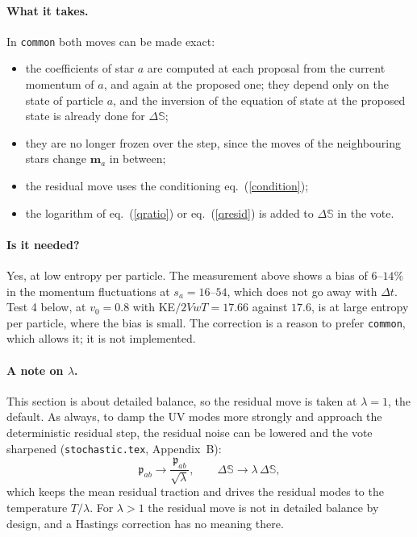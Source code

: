\documentclass[11pt,aps,preprint,nofootinbib,superscriptaddress,tightenlines]{revtex4-2}
\def\st{\begin{equation}}
\def\stp{\end{equation}}
\def\Eq#1{eq.~(\ref{#1})}
\let\oldparagraph\paragraph
\renewcommand{\paragraph}{\par\bigskip\oldparagraph}
\begin{document}
\paragraph{What it takes.}  In \texttt{common} both moves can be made exact:
\begin{itemize}
\item the coefficients of star $a$ are computed at each proposal from the current momentum of $a$, and again at the proposed one; they
  depend only on the state of particle $a$, and the inversion of the equation of state at the proposed state is already done for
  $\Delta\mathbb S$;
\item they are no longer frozen over the step, since the moves of the neighbouring stars change $\bm m_a$ in between;
\item the residual move uses the conditioning \Eq{condition};
\item the logarithm of \Eq{qratio} or \Eq{qresid} is added to $\Delta\mathbb S$ in the vote.
\end{itemize}

\paragraph{Is it needed?}  Yes, at low entropy per particle.  The measurement above shows a bias of $6$--$14\%$ in the momentum
fluctuations at $s_a=16$--$54$, which does not go away with $\Delta t$.  Test 4 below, at $v_0=0.8$ with KE$/2VwT=17.66$ against $17.6$,
is at large entropy per particle, where the bias is small.  The correction is a reason to prefer \texttt{common}, which allows it;
it is not implemented.

\paragraph{A note on $\lambda$.}  This section is about detailed balance, so the residual move is taken at $\lambda=1$, the default.
As always, to damp the UV modes more strongly and approach the deterministic residual step, the residual noise can be lowered
and the vote sharpened (\texttt{stochastic.tex}, Appendix~B):
\st
\mathfrak p_{ab}\to\frac{\mathfrak p_{ab}}{\sqrt\lambda},\qquad \Delta\mathbb S\to\lambda\,\Delta\mathbb S ,
\stp
which keeps the mean residual traction and drives the residual modes to the temperature $T/\lambda$.  For $\lambda>1$ the residual
move is not in detailed balance by design, and a Hastings correction has no meaning there.

\end{document}
